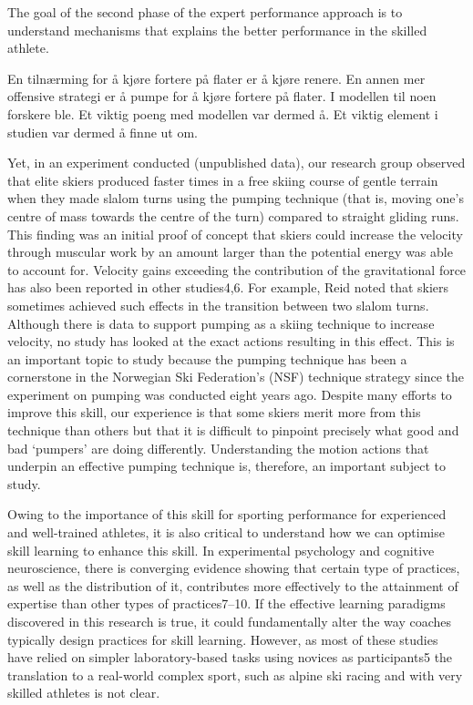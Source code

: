 \documentclass[letterpaper,10pt]{article}
\begin{document}
The goal of the second phase of the expert performance approach is to understand mechanisms that explains the better performance in the skilled athlete. 

En tilnærming for å kjøre fortere på flater er å kjøre renere. En annen mer offensive strategi er å pumpe for å kjøre fortere på flater. I modellen til noen forskere ble. Et viktig poeng med modellen var dermed å. Et viktig element i studien var dermed å finne ut om.    

Yet, in an experiment conducted (unpublished data), our research group observed that elite skiers produced faster times in a free skiing course of gentle terrain when they made slalom turns using the pumping technique (that is, moving one’s centre of mass towards the centre of the turn) compared to straight gliding runs. This finding was an initial proof of concept that skiers could increase the velocity through muscular work by an amount larger than the potential energy was able to account for. Velocity gains exceeding the contribution of the gravitational force has also been reported in other studies4,6. For example, Reid noted that skiers sometimes achieved such effects in the transition between two slalom turns. Although there is data to support pumping as a skiing technique to increase velocity, no study has looked at the exact actions resulting in this effect. This is an important topic to study because the pumping technique has been a cornerstone in the Norwegian Ski Federation’s (NSF) technique strategy since the experiment on pumping was conducted eight years ago. Despite many efforts to improve this skill, our experience is that some skiers merit more from this technique than others but that it is difficult to pinpoint precisely what good and bad ‘pumpers’ are doing differently. Understanding the motion actions that underpin an effective pumping technique is, therefore, an important subject to study.

Owing to the importance of this skill for sporting performance for experienced and well-trained athletes, it is also critical to understand how we can optimise skill learning to enhance this skill. In experimental psychology and cognitive neuroscience, there is converging evidence showing that certain type of practices, as well as the distribution of it, contributes more effectively to the attainment of expertise than other types of practices7–10. If the effective learning paradigms discovered in this research is true, it could fundamentally alter the way coaches typically design practices for skill learning. However, as most of these studies have relied on simpler laboratory-based tasks using novices as participants5 the translation to a real-world complex sport, such as alpine ski racing and with very skilled athletes is not clear. 
\end{document}
